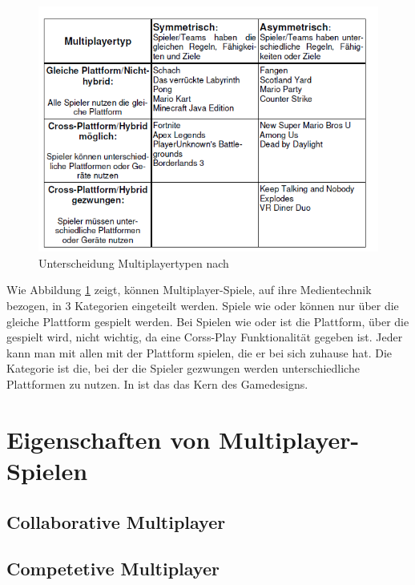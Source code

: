 \begin{figure}[ht]
\centering
\includegraphics[width=1\linewidth]{content/pictures/lotz_hybrid_multiplayer.PNG}
\caption{Unterscheidung Multiplayertypen nach \cite[S.6]{lotz_konzeption_2021}}
\label{fig:lotz_multiplayer_types}
\end{figure}

Wie Abbildung \ref{fig:lotz_multiplayer_types} zeigt, können Multiplayer-Spiele, auf ihre Medientechnik bezogen, in 3 Kategorien eingeteilt werden.
Spiele wie  oder  können nur über die gleiche Plattform gespielt werden. Bei Spielen wie  oder  ist die Plattform, über die gespielt wird, nicht wichtig, da eine Corss-Play Funktionalität gegeben ist. Jeder kann man mit allen mit der Plattform spielen, die er bei sich zuhause hat. Die Kategorie ist die, bei der die Spieler gezwungen werden unterschiedliche Plattformen zu nutzen. In  ist das das Kern des Gamedesigns.

\section{Eigenschaften von Multiplayer-Spielen}

\subsection{Collaborative Multiplayer}

\subsection{Competetive Multiplayer}

